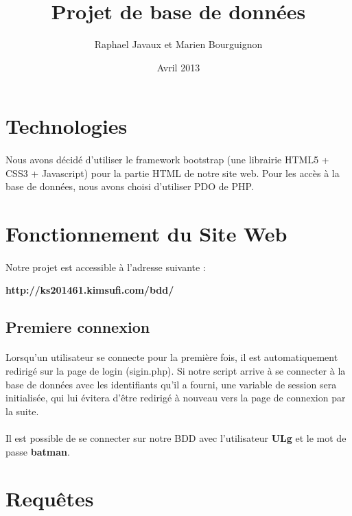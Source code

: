 \documentclass[a4paper]{article}
\title{Projet de base de données}
\author{Raphael Javaux et Marien Bourguignon}
\date{Avril 2013}
\begin{document}
\maketitle

\section{Technologies}
    \paragraph{}Nous avons décidé d'utiliser le framework bootstrap (une
librairie HTML5 + CSS3 + Javascript) pour la partie HTML de notre site web.
    Pour les accès à la base de données, nous avons choisi d'utiliser PDO
de PHP.

\section{Fonctionnement du Site Web}
    \paragraph{}Notre projet est accessible à l'adresse suivante :
    \begin{center}
        \textbf{http://ks201461.kimsufi.com/bdd/}
    \end{center}

      \subsection{Premiere connexion}
        \paragraph{}Lorsqu'un utilisateur se connecte pour la première fois, il 
est automatiquement redirigé sur la page de login (sigin.php).
    Si notre script arrive à se connecter à la base de données avec les 
identifiants qu'il a fourni, une variable de session sera initialisée, qui lui
évitera d'être redirigé à nouveau vers la page de connexion par la suite.

        \paragraph{}Il est possible de se connecter sur notre BDD 
avec l'utilisateur \textbf{ULg} et le mot de passe \textbf{batman}.

\section{Requêtes}
\end{document}
